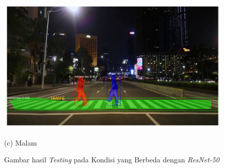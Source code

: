 \documentclass[conference]{IEEEtran}
\begin{document}
\begin{figure}[h]
\begin{minipage}[b]{0.2\textwidth}
		\end{minipage}
		\hfill
		\begin{minipage}[b]{0.2\textwidth}
			\includegraphics[width=\textwidth]{img/malam-frame180-resnet50.png}
			\caption*{(c) Malam}
		\end{minipage}
		\caption{{Gambar hasil \textit{Testing} pada Kondisi yang Berbeda dengan \textit{ResNet-50}}}
		\label{fig:resnet-50}
	\end{figure}
\end{document}
